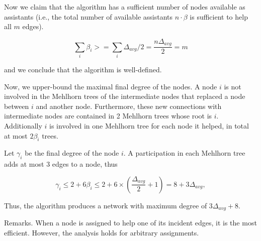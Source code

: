 \documentclass{article}
\begin{document}
\medskip

Now we claim that the algorithm has a sufficient number of nodes available as assistants
 (i.e., the total number of available assistants $n \cdot \beta$ is sufficient to help all $m$ edges).

  $$\sum_i \beta_i >= \sum_i \Delta_{avg}/2 = \frac{n\Delta_{avg}}{2} = m$$

and we conclude that the algorithm is well-defined.

\medskip

Now, we upper-bound the maximal final degree of the nodes.
A node $i$ is not involved in the Mehlhorn trees of the intermediate nodes
that replaced a node between $i$ and another node.
Furthermore, these new connections with intermediate nodes are contained in 2 Mehlhorn trees
whose root is $i$. Additionally $i$ is involved in one Mehlhorn tree
for each node it helped, in total at most $2\beta_i$ trees.

Let $\gamma_i$ be the final degree of the node $i$.
A participation in each Mehlhorn tree adds at most $3$ edges to a node, thus

$$\gamma_i \leq 2 + 6\beta_i \leq 2 + 6 \times \left(\frac{\Delta_{avg}}{2}+1\right) = 8 + 3\Delta_{avg},$$

Thus, the algorithm produces a network
with maximum degree of $3\Delta_{avg} + 8$.



Remarks.
When a node is assigned to help one of its incident edges, it is the most efficient.
However, the analysis holds for arbitrary assignments.
\end{document}
